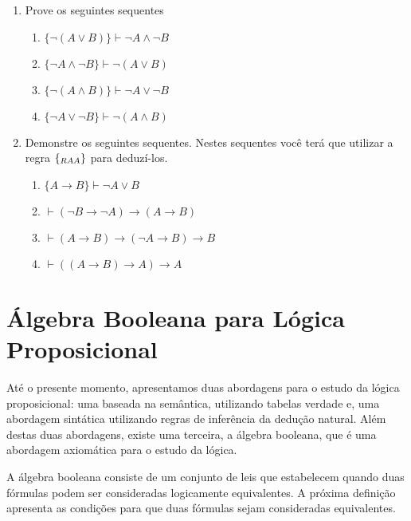 \begin{enumerate}
       \item Prove os seguintes sequentes
       \begin{enumerate}
                  \item $\{\neg(A \lor B)\}\vdash \neg A \land \neg B$
                  \item $\{\neg A \land \neg B\}\vdash \neg (A\lor B)$
                  \item $\{\neg(A \land B)\}\vdash \neg A \lor \neg B$
                  \item $\{\neg A \lor \neg B\}\vdash \neg (A\land B)$
	\end{enumerate}
        \item Demonstre os seguintes sequentes. Nestes sequentes você
          terá que utilizar a regra $\scriptsize{\{_{RAA}\}}$ para deduzí-los.
        \begin{enumerate}
             \item $\{A \to B\}\vdash \neg A \lor B$
             \item $\vdash (\neg B \to \neg A)\to (A \to B)$
             \item $\vdash (A \to B)\to (\neg A \to B) \to B$
             \item $\vdash ((A \to B)\to A)\to A$
        \end{enumerate}
\end{enumerate}

\section{Álgebra Booleana para Lógica Proposicional}

Até o presente momento, apresentamos duas abordagens para o estudo da
lógica proposicional: uma baseada na semântica, utilizando tabelas
verdade e, uma abordagem sintática utilizando regras de inferência da
dedução natural. Além destas duas abordagens, existe uma terceira,
a álgebra booleana, que é uma abordagem axiomática para o estudo da
lógica.

A álgebra booleana consiste de um conjunto de leis que estabelecem
quando duas fórmulas podem ser consideradas
logicamente equivalentes. A próxima definição apresenta as condições
para que duas fórmulas sejam consideradas equivalentes.

